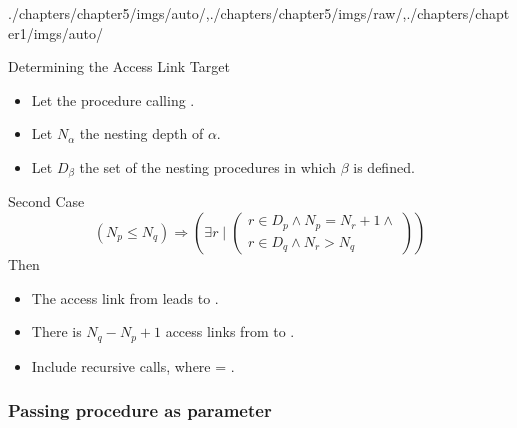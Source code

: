 \begin{graphicspathcontext}{{./chapters/chapter5/imgs/auto/},{./chapters/chapter5/imgs/raw/},{./chapters/chapter1/imgs/auto/}}
\begin{bibunit}[apalike]
\begin{frame}[t,background=6]{Determining the Access Link Target}
	\begin{small}
		\begin{itemize}
			\item Let the procedure  calling .
			\item Let $N_\alpha$ the nesting depth of $\alpha$.
			\item Let $D_\beta$ the set of the nesting procedures in which $\beta$ is defined.
		\end{itemize}
	\end{small}
	\begin{block}{Second Case}
		\[ \left( N_p \le N_q \right) \Rightarrow \left( \exists r \; \bigg| \; \begin{pmatrix}
		r \in D_p \wedge N_p = N_r + 1 \wedge \\
		r \in D_q \wedge N_r > N_q
		\end{pmatrix} \right) \]
		Then \begin{itemize}
			\item The access link from  leads to .
			\item There is $N_q - N_p + 1$ access links from  to .
			\item Include recursive calls, where  = .
		\end{itemize}
	\end{block}
\end{frame}

\subsubsection{Passing procedure as parameter}
\subsubsectiontableofcontentslide


\end{bibunit}
\end{graphicspathcontext}

